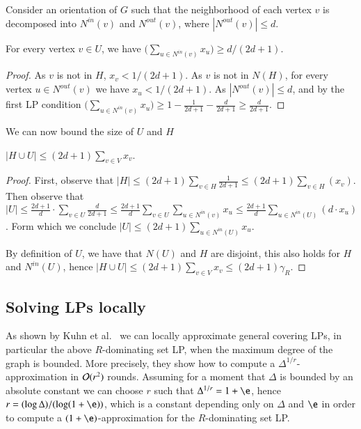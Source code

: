 Consider an orientation of $G$ such that the neighborhood of each vertex
$v$ is decomposed into $N^{in}(v)$ and $N^{out}(v)$, where $|N^{out}(v)|\le d$.

\begin{claim}
  For every vertex $v\in U$, we have
  $\big(\sum_{u\in N^{in}(v)}x_u \big)\ge d/(2d+1)$.
\end{claim}
\begin{proof}
  As $v$ is not in $H$, $x_v<1/(2d+1)$. As $v$ is not in $N(H)$, for every
  vertex $u\in N^{out}(v)$ we have $x_u<1/(2d+1)$. As $|N^{out}(v)|\le d$,
  and by the first LP condition
  $\big(\sum_{u\in N^{in}(v)}x_u \big)\ge 1- \frac{1}{2d+1} - \frac{d}{2d+1}
  \ge \frac{d}{2d+1}$.
\end{proof}

We can now bound the size of $U$ and $H$
\begin{claim}
  $|H\cup U| \le (2d+1)\sum_{v\in V}x_v$.
\end{claim}
\begin{proof}
  First, observe that
  $|H|\le (2d+1)\sum_{v\in H}\frac{1}{2d+1}
  \le (2d+1)\sum_{v\in H}(x_v)$.
  Then observe that\linebreak
  $|U|\le \frac{2d+1}{d}\cdot\sum_{v\in U} \frac{d}{2d+1}
  \le \frac{2d+1}{d}\sum_{v\in U}\sum_{u\in N^{in}(v)}x_u
  \le \frac{2d+1}{d}\sum_{u\in N^{in}(U)} (d\cdot x_u)$.
  Form which we conclude
  $|U|
  \le (2d+1) \sum_{u\in N^{in}(U)} x_u$.

  By definition of $U$, we have that $N(U)$ and $H$ are disjoint, this also
  holds for $H$ and $N^{in}(U)$, hence $|H\cup U| \le (2d+1)\sum_{v\in V}x_v\leq (2d+1)\gamma_R$.
\end{proof}

\subsection{Solving LPs locally}

As shown by Kuhn et al.~\cite{kuhn2006price} we can locally approximate
general covering LPs, in particular the above $R$-dominating set LP,
when the maximum
degree of the graph is bounded. More precisely, they show how to compute
a $\Delta^{1/r}$-approximation in $\mathcal{O}(r^2)$ rounds. Assuming for a
moment that $\Delta$ is bounded by an absolute constant we can
choose $r$ such that $\Delta^{1/r}=1+\e$,
hence $r=(\log \Delta)/(\log (1+\e))$, which is a constant depending
only on $\Delta$ and $\e$ in order to compute a
$(1+\e)$-approximation for the $R$-dominating set LP.

